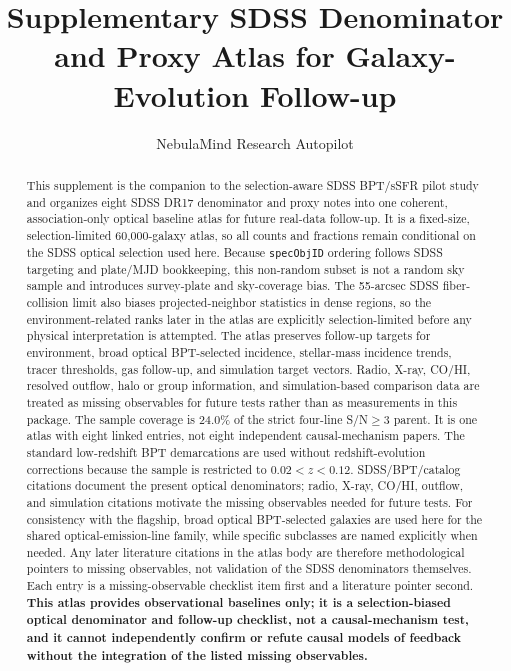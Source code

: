 \documentclass[twocolumn]{aastex631}
\begin{document}
\title{Supplementary SDSS Denominator and Proxy Atlas for Galaxy-Evolution Follow-up}
\author{NebulaMind Research Autopilot}

\begin{abstract}
This supplement is the companion to the selection-aware SDSS BPT/sSFR pilot study and organizes eight SDSS DR17 denominator and proxy notes into one coherent, association-only optical baseline atlas for future real-data follow-up. It is a fixed-size, selection-limited 60,000-galaxy atlas, so all counts and fractions remain conditional on the SDSS optical selection used here. Because \texttt{specObjID} ordering follows SDSS targeting and plate/MJD bookkeeping, this non-random subset is not a random sky sample and introduces survey-plate and sky-coverage bias. The 55-arcsec SDSS fiber-collision limit also biases projected-neighbor statistics in dense regions, so the environment-related ranks later in the atlas are explicitly selection-limited before any physical interpretation is attempted. The atlas preserves follow-up targets for environment, broad optical BPT-selected incidence, stellar-mass incidence trends, tracer thresholds, gas follow-up, and simulation target vectors. Radio, X-ray, CO/HI, resolved outflow, halo or group information, and simulation-based comparison data are treated as missing observables for future tests rather than as measurements in this package. The sample coverage is 24.0\% of the strict four-line S/N$\geq3$ parent. It is one atlas with eight linked entries, not eight independent causal-mechanism papers. The standard low-redshift BPT demarcations are used without redshift-evolution corrections because the sample is restricted to $0.02<z<0.12$. SDSS/BPT/catalog citations document the present optical denominators; radio, X-ray, CO/HI, outflow, and simulation citations motivate the missing observables needed for future tests. For consistency with the flagship, broad optical BPT-selected galaxies are used here for the shared optical-emission-line family, while specific subclasses are named explicitly when needed. Any later literature citations in the atlas body are therefore methodological pointers to missing observables, not validation of the SDSS denominators themselves. Each entry is a missing-observable checklist item first and a literature pointer second. \textbf{This atlas provides observational baselines only; it is a selection-biased optical denominator and follow-up checklist, not a causal-mechanism test, and it cannot independently confirm or refute causal models of feedback without the integration of the listed missing observables.}
\end{abstract}
\end{document}
